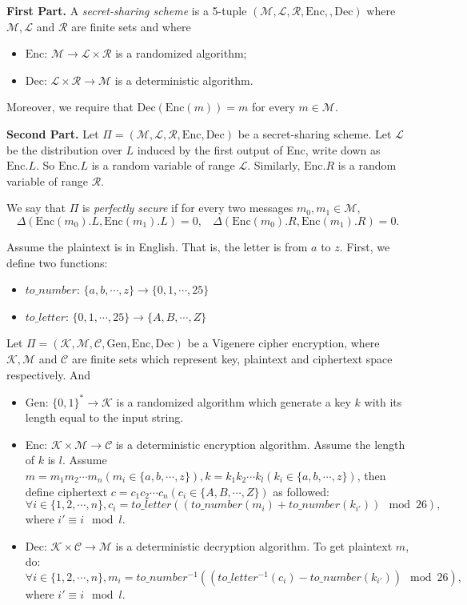 \documentclass[12pt]{article}
\newcommand{\K}{\mathcal{K}}
\newcommand{\M}{\mathcal{M}}
\newcommand{\C}{\mathcal{C}}
\newcommand{\Enc}{\text{Enc}}
\newcommand{\Dec}{\text{Dec}}
\newcommand{\Gen}{\text{Gen}}
\newenvironment{problem}[2][Problem]{\begin{trivlist}
\item[\hskip \labelsep {\bfseries #1}\hskip \labelsep {\bfseries #2.}]}{\end{trivlist}}
\begin{document}
\begin{problem}{3} 
\textbf{First Part.}
A \textit{secret-sharing scheme} is a 5-tuple $(\mathcal{M},\mathcal{L},\mathcal{R},\Enc,,\Dec)$ where
$\mathcal{M},\mathcal{L}$ and $\mathcal{R}$ are finite sets and where
\begin{itemize}
    \item $\Enc$: $\mathcal{M}\rightarrow \mathcal{L}\times \mathcal{R}$ is a randomized algorithm;
    \item Dec: $\mathcal{L}\times \mathcal{R}\rightarrow\mathcal{M}$ is a deterministic algorithm.
\end{itemize}
Moreover, we require that $\Dec(\Enc(m))=m$ for every $m\in\mathcal{M}$.

\textbf{Second Part.} 
Let $\Pi=(\mathcal{M},\mathcal{L},\mathcal{R},\Enc,\Dec)$ be a secret-sharing scheme. Let $\mathcal{L}$ be the distribution over $L$ induced by the first output of Enc, write down as $\Enc.L$. So $\Enc.L$ is a random variable of range $\mathcal{L}$. Similarly, $\Enc.R$ is a random variable of range $\mathcal{R}$.

We say that $\Pi$ is \textit{perfectly secure} if for every two messages $m_0, m_1\in\mathcal{M}$, 
\[\Delta(\Enc(m_0).L, \Enc(m_1).L)=0,\ \ \ \ \Delta(\Enc(m_0).R, \Enc(m_1).R)=0.\]
\end{problem}


\begin{problem}{1.3} 
Assume the plaintext is in English. That is, the letter is from $a$ to $z$. First, we define two functions:
\begin{itemize}
    \item $to\_number$: $\{a,b,\cdots,z\}\rightarrow\{0,1,\cdots,25\}$
    \item $to\_letter$: $\{0,1,\cdots,25\}\rightarrow\{A,B,\cdots,Z\}$
\end{itemize}
Let $\Pi=(\mathcal{K},\mathcal{M},\mathcal{C},\Gen, \Enc,\Dec)$ be a Vigenere cipher encryption, where
$\mathcal{K},\mathcal{M}$ and $\mathcal{C}$ are finite sets which represent key, plaintext and ciphertext space respectively. And
\begin{itemize}
    \item Gen: $\{0,1\}^*\rightarrow\K$ is a randomized algorithm which generate a key $k$ with its length equal to the input string.
    \item Enc: $\K\times\M\rightarrow\C$ is a deterministic  encryption  algorithm. Assume the length of $k$ is $l$. Assume $m=m_1m_2\cdots m_n(m_i\in\{a,b,\cdots,z\}),k=k_1k_2\cdots k_l(k_i\in\{a,b,\cdots,z\})$, then define ciphertext $c=c_1c_2\cdots c_n(c_i\in\{A,B,\cdots,Z\})$ as followed:
    $$\forall i\in\{1,2,\cdots,n\}, c_i=to\_letter( (to\_number(m_i)+to\_number(k_{i'}))\mod 26) , $$
    where $i'\equiv i\mod l$.
    \item Dec: $\K\times\C\rightarrow\M$ is a deterministic  decryption  algorithm. To get plaintext $m$, do:
    $$ \forall i\in\{1,2,\cdots,n\}, m_i=to\_number^{-1}( (to\_letter^{-1}(c_i)-to\_number(k_{i'}))\mod 26) , $$
    where $i'\equiv i\mod l$.
\end{itemize}
\end{problem}
\end{document}
